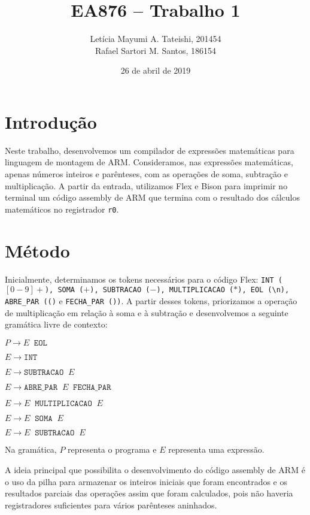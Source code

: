\documentclass[brazilian,a4paper,twocolumn]{article}
\title{EA876 -- Trabalho 1}
\author{Letícia Mayumi A. Tateishi, 201454\\Rafael Sartori M. Santos, 186154}
\date{26 de abril de 2019}
\newcommand{\s}{\;\;}
\begin{document}
\maketitle

\section{Introdução}

    Neste trabalho, desenvolvemos um compilador de expressões matemáticas para linguagem de montagem de ARM. Consideramos, nas expressões matemáticas, apenas números inteiros e parênteses, com as operações de soma, subtração e multiplicação. A partir da entrada, utilizamos Flex e Bison para imprimir no terminal um código assembly de ARM que termina com o resultado dos cálculos matemáticos no registrador \texttt{r0}.

\section{Método}

    Inicialmente, determinamos os tokens necessários para o código Flex: \texttt{INT ($[0-9]+$), SOMA ($+$), SUBTRACAO ($-$), MULTIPLICACAO ($*$), EOL (\textbackslash{}n), ABRE\_PAR (()} e \texttt{FECHA\_PAR ())}. A partir desses tokens, priorizamos a operação de multiplicação em relação à soma e à subtração e desenvolvemos a seguinte gramática livre de contexto:

    $P \xrightarrow{} E \s \texttt{EOL}$

    $E \xrightarrow{} \texttt{INT}$

    $E \xrightarrow{} \texttt{SUBTRACAO} \s E$

    $E \xrightarrow{} \texttt{ABRE\_PAR} \s E \s \texttt{FECHA\_PAR}$

    $E \xrightarrow{} E \s \texttt{MULTIPLICACAO} \s E$

    $E \xrightarrow{} E \s \texttt{SOMA} \s E$

    $E \xrightarrow{} E \s \texttt{SUBTRACAO} \s E$

    Na gramática, $P$ representa o programa e $E$ representa uma expressão.

    A ideia principal que possibilita o desenvolvimento do código assembly de ARM é o uso da pilha para armazenar os inteiros iniciais que foram encontrados e os resultados parciais das operações assim que foram calculados, pois não haveria registradores suficientes para vários parênteses aninhados.
\end{document}
